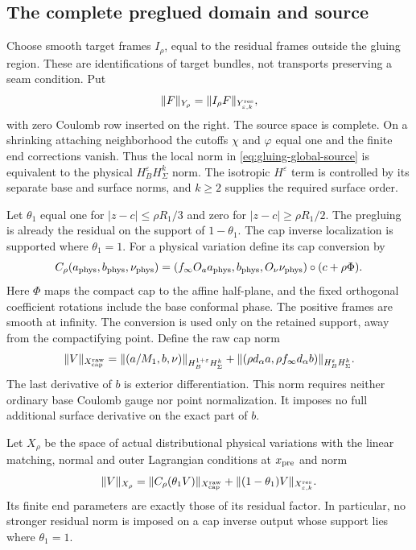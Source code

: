 \documentclass[11pt]{amsart}
\theoremstyle{definition}
\theoremstyle{remark}
\theoremstyle{plain}
\begin{document}
\subsection{The complete preglued domain and source}

Choose smooth target frames $I_\rho$, equal to the residual frames
outside the gluing region. These are identifications of target bundles,
not transports preserving a seam condition. Put
\begin{equation}\label{eq:gluing-global-source}
                       \|F\|_{Y_\rho}
              =\|I_\rho F\|_{Y^{\rm res}_{\varepsilon,k}},
\end{equation}
with zero Coulomb row inserted on the right. The source space is
complete. On a shrinking attaching neighborhood the cutoffs $\chi$
and $\varphi$ equal one and the finite end corrections vanish.
Thus the local norm in \eqref{eq:gluing-global-source} is equivalent
to the physical $H_B^\varepsilon H^k_\Sigma$ norm. The isotropic
$H^\varepsilon$ term is controlled by its separate base and surface
norms, and $k\geq2$ supplies the required surface order.

Let $\theta_1$ equal one for $|z-c|\leq\rho R_1/3$ and zero
for $|z-c|\geq\rho R_1/2$. The pregluing is already the residual
on the support of $1-\theta_1$. The cap inverse localization is
supported where $\theta_1=1$. For a physical variation define its
cap conversion by
\[
 C_\rho(a_{\rm phys},b_{\rm phys},\nu_{\rm phys})
      =(f_\infty O_a a_{\rm phys},b_{\rm phys},O_\nu\nu_{\rm phys})
                                             \circ(c+\rho\Phi).
\]
Here $\Phi$ maps the compact cap to the affine half-plane, and the
fixed orthogonal coefficient rotations include the base conformal
phase. The positive frames are smooth at infinity. The conversion
is used only on the retained support, away from the compactifying
point. Define the raw cap norm
\begin{equation}\label{eq:gluing-raw-cap-norm}
 \|V\|_{X^{\rm raw}_{\rm cap}}=
 \|(a/M_1,b,\nu)\|_{H_B^{1+\varepsilon}H^k_\Sigma}
  +\|(\rho d_\alpha a,\rho f_\infty d_\alpha b)\|_{H_B^\varepsilon H^k_\Sigma}.
\end{equation}
The last derivative of $b$ is exterior differentiation. This norm
requires neither ordinary base Coulomb gauge nor point normalization.
It imposes no full additional surface derivative on the exact part
of $b$.

Let $X_\rho$ be the space of actual distributional physical variations
with the linear matching, normal and outer Lagrangian conditions at
$x_{\rm pre}$ and norm
\begin{equation}\label{eq:gluing-global-domain}
 \|V\|_{X_\rho}
   =\|C_\rho(\theta_1V)\|_{X^{\rm raw}_{\rm cap}}
                   +\|(1-\theta_1)V\|_{X^{\rm res}_{\varepsilon,k}}.
\end{equation}
Its finite end parameters are exactly those of its residual factor.
In particular, no stronger residual norm is imposed on a cap inverse
output whose support lies where $\theta_1=1$.
\end{document}
